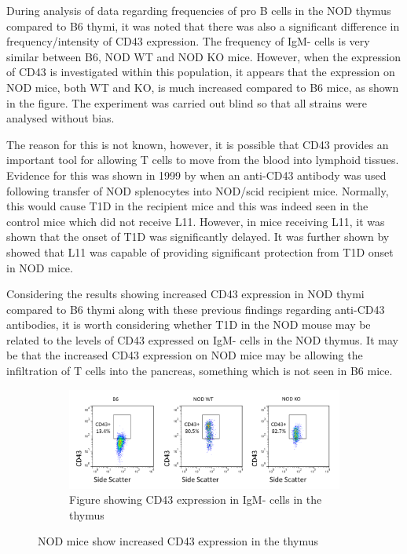 During analysis of data regarding frequencies of pro B cells in the NOD thymus compared to B6 thymi, it was noted that there was also a significant difference in frequency/intensity of CD43 expression.
The frequency of IgM- cells is very similar between B6, NOD WT and NOD KO mice.
However, when the expression of CD43 is investigated within this population, it appears that the expression on NOD mice, both WT and KO, is much increased compared to B6 mice, as shown in the figure.
The experiment was carried out blind so that all strains were analysed without bias.

The reason for this is not known, however, it is possible that CD43 provides an important tool for allowing T cells to move from the blood into lymphoid tissues.
Evidence for this was shown in 1999 by \citet{Mikulowska1999} when an anti-CD43 antibody was used following transfer of NOD splenocytes into NOD/scid recipient mice. 
Normally, this would cause T1D in the recipient mice and this was indeed seen in the control mice which did not receive L11.
However, in mice receiving L11, it was shown that the onset of T1D was significantly delayed.
It was further shown by \citet{Johnson1999} showed that L11 was capable of providing significant protection from T1D onset in NOD mice.

Considering the results showing increased CD43 expression in NOD thymi compared to B6 thymi along with these previous findings regarding anti-CD43 antibodies, it is worth considering whether T1D in the NOD mouse may be related to the levels of CD43 expressed on IgM- cells in the NOD thymus.
It may be that the increased CD43 expression on NOD mice may be allowing the infiltration of T cells into the pancreas, something which is not seen in B6 mice.

\begin{figure}
	\begin{subfigure}{\textwidth}
	\includegraphics[width=\textwidth]{Figures/CD43expression.png}
	\caption{Figure showing CD43 expression in IgM- cells in the thymus}
	\end{subfigure}
\caption{NOD mice show increased CD43 expression in the thymus}
\end{figure}

